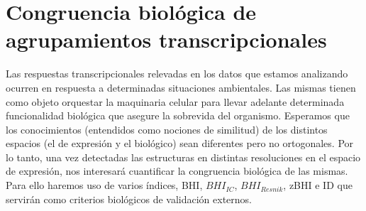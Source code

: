 \chapter{Congruencia biológica de agrupamientos transcripcionales}
Las respuestas transcripcionales relevadas en los datos que estamos analizando ocurren en respuesta a determinadas situaciones ambientales. Las mismas tienen como objeto orquestar la maquinaria celular para llevar adelante determinada funcionalidad biológica que asegure la sobrevida del organismo. Esperamos que los conocimientos (entendidos como nociones de similitud) de los distintos espacios (el de expresión y el biológico) sean diferentes pero no ortogonales. Por lo tanto, una vez detectadas las estructuras en distintas resoluciones en el espacio de expresión, nos interesará cuantificar la congruencia biológica de las mismas. Para ello haremos uso de varios índices, BHI, $BHI_{IC}$, $BHI_{Resnik}$, zBHI e ID que servirán como criterios biológicos de validación externos.

